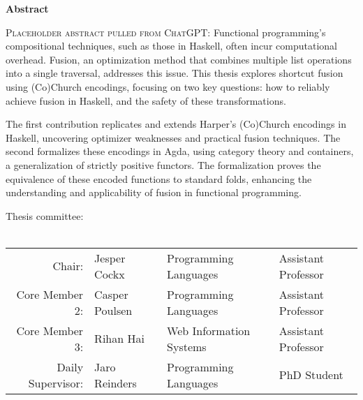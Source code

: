 \thispagestyle{plain}
\begin{center}
    \Large
    \textbf{\thetitle}
        
    \vspace{0.4cm}
    \large
    \thesubtitle
        
    \vspace{0.4cm}
    \textbf{\thename}
       
    \vspace{1.9cm}
    \textbf{Abstract}
\end{center}
\begin{adjustwidth}{2cm}{2cm}
\textsc{Placeholder abstract pulled from ChatGPT:}
Functional programming's compositional techniques, such as those in Haskell, often incur computational overhead.
Fusion, an optimization method that combines multiple list operations into a single traversal, addresses this issue.
This thesis explores shortcut fusion using (Co)Church encodings, focusing on two key questions: how to reliably achieve fusion in Haskell, and the safety of these transformations.

The first contribution replicates and extends Harper's (Co)Church encodings in Haskell, uncovering optimizer weaknesses and practical fusion techniques.
The second formalizes these encodings in Agda, using category theory and containers, a generalization of strictly positive functors.
The formalization proves the equivalence of these encoded functions to standard folds, enhancing the understanding and applicability of fusion in functional programming.
\end{adjustwidth}

\vfill 

\begin{center}
    Thesis committee:\\~\\
    \begin{tabular}{r l l l}
        Chair: & Jesper Cockx & Programming Languages & Assistant Professor \\
        Core Member 2: & Casper Poulsen & Programming Languages & Assistant Professor \\
        Core Member 3: & Rihan Hai & Web Information Systems & Assistant Professor \\
        Daily Supervisor: & Jaro Reinders & Programming Languages & PhD Student 
    \end{tabular}
\end{center}
\vspace{1cm}
\pagebreak